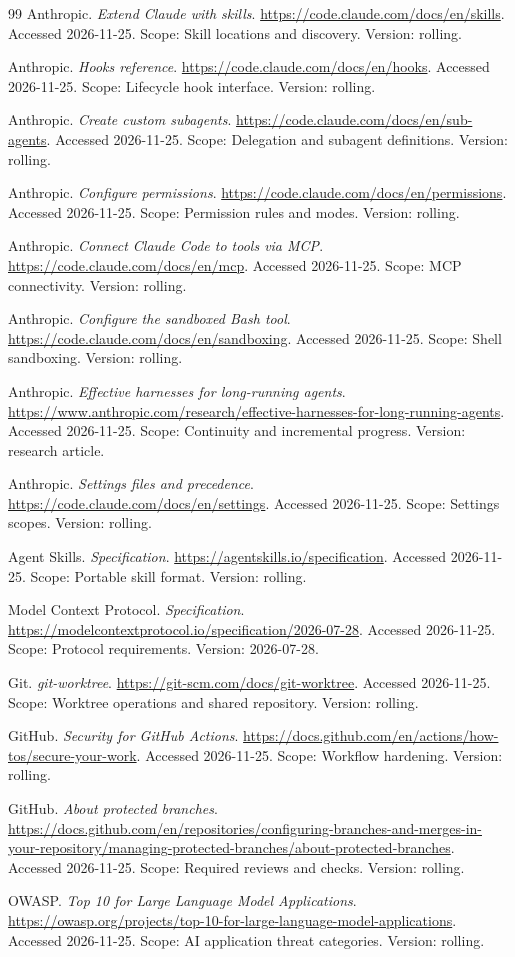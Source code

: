 \documentclass[11pt,oneside,openany]{book}
\begin{document}
\begin{thebibliography}{99}
 Anthropic. \emph{Extend Claude with skills}. \url{https://code.claude.com/docs/en/skills}. Accessed 2026-11-25. Scope: Skill locations and discovery. Version: rolling.

 Anthropic. \emph{Hooks reference}. \url{https://code.claude.com/docs/en/hooks}. Accessed 2026-11-25. Scope: Lifecycle hook interface. Version: rolling.

 Anthropic. \emph{Create custom subagents}. \url{https://code.claude.com/docs/en/sub-agents}. Accessed 2026-11-25. Scope: Delegation and subagent definitions. Version: rolling.

 Anthropic. \emph{Configure permissions}. \url{https://code.claude.com/docs/en/permissions}. Accessed 2026-11-25. Scope: Permission rules and modes. Version: rolling.

 Anthropic. \emph{Connect Claude Code to tools via MCP}. \url{https://code.claude.com/docs/en/mcp}. Accessed 2026-11-25. Scope: MCP connectivity. Version: rolling.

 Anthropic. \emph{Configure the sandboxed Bash tool}. \url{https://code.claude.com/docs/en/sandboxing}. Accessed 2026-11-25. Scope: Shell sandboxing. Version: rolling.

 Anthropic. \emph{Effective harnesses for long-running agents}. \url{https://www.anthropic.com/research/effective-harnesses-for-long-running-agents}. Accessed 2026-11-25. Scope: Continuity and incremental progress. Version: research article.

 Anthropic. \emph{Settings files and precedence}. \url{https://code.claude.com/docs/en/settings}. Accessed 2026-11-25. Scope: Settings scopes. Version: rolling.

 Agent Skills. \emph{Specification}. \url{https://agentskills.io/specification}. Accessed 2026-11-25. Scope: Portable skill format. Version: rolling.

 Model Context Protocol. \emph{Specification}. \url{https://modelcontextprotocol.io/specification/2026-07-28}. Accessed 2026-11-25. Scope: Protocol requirements. Version: 2026-07-28.

 Git. \emph{git-worktree}. \url{https://git-scm.com/docs/git-worktree}. Accessed 2026-11-25. Scope: Worktree operations and shared repository. Version: rolling.

 GitHub. \emph{Security for GitHub Actions}. \url{https://docs.github.com/en/actions/how-tos/secure-your-work}. Accessed 2026-11-25. Scope: Workflow hardening. Version: rolling.

 GitHub. \emph{About protected branches}. \url{https://docs.github.com/en/repositories/configuring-branches-and-merges-in-your-repository/managing-protected-branches/about-protected-branches}. Accessed 2026-11-25. Scope: Required reviews and checks. Version: rolling.

 OWASP. \emph{Top 10 for Large Language Model Applications}. \url{https://owasp.org/projects/top-10-for-large-language-model-applications}. Accessed 2026-11-25. Scope: AI application threat categories. Version: rolling.

\end{thebibliography}
\end{document}
